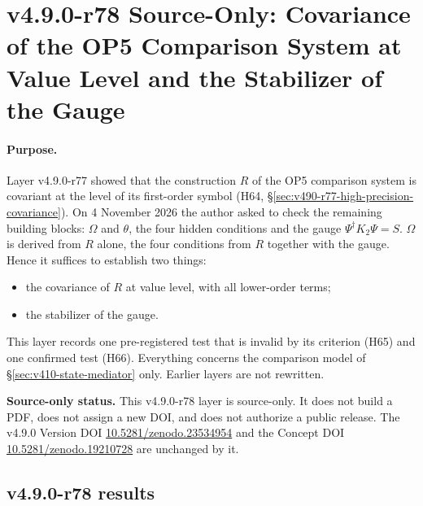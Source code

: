\clearpage
\section*{v4.9.0-r78 Source-Only: Covariance of the OP5 Comparison System at Value Level and the Stabilizer of the Gauge}
\label{sec:v490-r78-value-covariance}

\paragraph{Purpose.}
Layer v4.9.0-r77 showed that the construction \(R\) of the OP5 comparison system is covariant at the level of its first-order
symbol (H64, \S\ref{sec:v490-r77-high-precision-covariance}).  On 4 November 2026 the author asked to check the remaining
building blocks: \(\Omega\) and \(\theta\), the four hidden conditions and the gauge \(\Psi^\dagger K_2\Psi=S\).  \(\Omega\) is
derived from \(R\) alone, the four conditions from \(R\) together with the gauge.  Hence it suffices to establish two things:
\begin{itemize}[leftmargin=2em]
\item the covariance of \(R\) at value level, with all lower-order terms;
\item the stabilizer of the gauge.
\end{itemize}
This layer records one pre-registered test that is invalid by its criterion (H65) and one confirmed test (H66).  Everything
concerns the comparison model of \S\ref{sec:v410-state-mediator} only.  Earlier layers are not rewritten.

\noindent\textbf{Source-only status.}
This v4.9.0-r78 layer is source-only.  It does not build a PDF, does not assign a new DOI,
and does not authorize a public release.  The v4.9.0 Version DOI
\href{https://doi.org/10.5281/zenodo.23534954}{10.5281/zenodo.23534954} and the Concept DOI
\href{https://doi.org/10.5281/zenodo.19210728}{10.5281/zenodo.19210728} are unchanged by it.

\subsection*{v4.9.0-r78 results}
\label{subsec:v490-r78-results}

